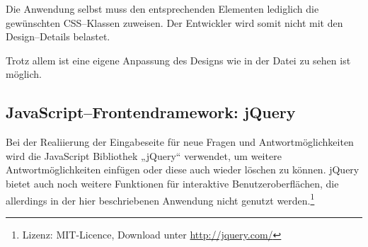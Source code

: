 Die Anwendung selbst muss den entsprechenden Elementen lediglich die gewünschten CSS--Klassen zuweisen. Der Entwickler wird somit nicht mit den Design--Details belastet.

Trotz allem ist eine eigene Anpassung des Designs wie in der Datei  zu sehen ist möglich. 

\subsection{JavaScript--Frontendramework: jQuery}

Bei der Realiierung der Eingabeseite für neue Fragen und Antwortmöglichkeiten wird die JavaScript Bibliothek „jQuery“ verwendet, um weitere Antwortmöglichkeiten einfügen oder diese auch wieder löschen zu können. jQuery bietet auch noch weitere Funktionen für interaktive Benutzeroberflächen, die allerdings in der hier beschriebenen Anwendung nicht genutzt werden.\footnote{Lizenz: MIT-Licence, Download unter \url{http://jquery.com/}}

